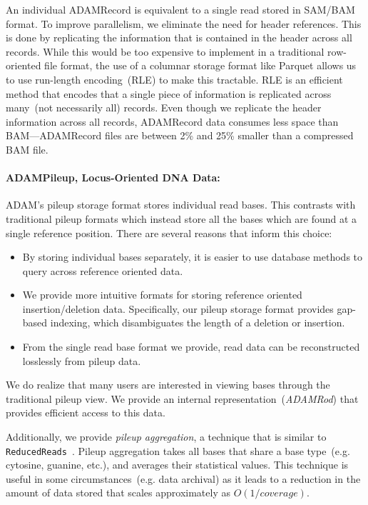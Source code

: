 \documentclass{bioinfo}
\begin{document}
An individual ADAMRecord is equivalent to a single read stored in SAM/BAM format. To improve parallelism, we eliminate the need for header references. This is done by
replicating the information that is contained in the header across all records. While this would be too expensive to implement in a traditional row-oriented file format, the use
of a columnar storage format like Parquet allows us to use run-length encoding~(RLE) to make this tractable. RLE is an efficient method that encodes that a single piece of
information is replicated across many~(not necessarily all) records. Even though we replicate the header information across all records, ADAMRecord data consumes less
space than BAM---ADAMRecord files are between 2\% and 25\% smaller than a compressed BAM file.

\paragraph{ADAMPileup, Locus-Oriented DNA Data:}
\label{sec:adampileup}

ADAM's pileup storage format stores individual read bases. This contrasts with traditional pileup formats which instead store all the bases which are found at a single reference
position. There are several reasons that inform this choice:

\begin{itemize}
\item By storing individual bases separately, it is easier to use database methods to query across reference oriented data.
\item We provide more intuitive formats for storing reference oriented insertion/deletion data. Specifically, our pileup storage format provides gap-based indexing, which
disambiguates the length of a deletion or insertion.
\item From the single read base format we provide, read data can be reconstructed losslessly from pileup data.
\end{itemize}

We do realize that many users are interested in viewing bases through the traditional pileup view. We provide an internal representation~(\textit{ADAMRod}) that provides
efficient access to this data.

Additionally, we provide \emph{pileup aggregation}, a technique that is similar to \texttt{ReducedReads}~\citep[see][]{mckenna10}. Pileup aggregation takes all bases that
share a base type~(e.g. cytosine, guanine, etc.), and averages their statistical values. This technique is useful in some circumstances~(e.g. data archival) as it leads to a
reduction in the amount of data stored that scales approximately as $O(1/coverage)$.
\end{document}
